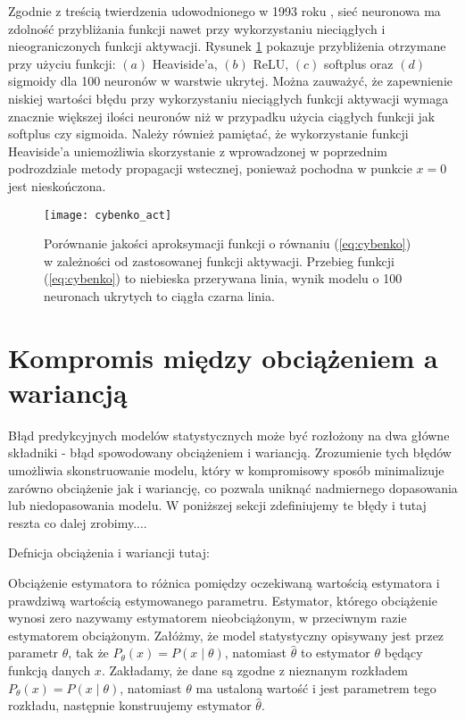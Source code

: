 \documentclass[11pt]{book}
\theoremstyle{definition}
\begin{document}
Zgodnie z treścią twierdzenia udowodnionego w 1993 roku \cite{Leshno1993MultilayerFN}, sieć neuronowa ma zdolność przybliżania funkcji nawet przy wykorzystaniu nieciągłych i nieograniczonych funkcji aktywacji. Rysunek \ref{fig:cybenko3} pokazuje przybliżenia otrzymane przy użyciu funkcji: $(a)$ Heaviside'a, $(b)$ ReLU, $(c)$ softplus oraz $(d)$ sigmoidy dla 100 neuronów w warstwie ukrytej. Można zauważyć, że zapewnienie niskiej wartości błędu przy wykorzystaniu nieciągłych funkcji aktywacji wymaga znacznie większej ilości neuronów niż w przypadku użycia ciągłych funkcji jak softplus czy sigmoida. Należy również pamiętać, że wykorzystanie funkcji Heaviside'a uniemożliwia skorzystanie z wprowadzonej w poprzednim podrozdziale metody propagacji wstecznej, ponieważ pochodna w punkcie $x=0$ jest nieskończona.
	
\begin{figure}[h!]
	\centering
	\texttt{[image: cybenko\_act]}
	\caption{Porównanie jakości aproksymacji funkcji o równaniu (\ref{eq:cybenko}) w zależności od zastosowanej funkcji aktywacji. Przebieg funkcji (\ref{eq:cybenko}) to niebieska przerywana linia, wynik modelu o 100 neuronach ukrytych to ciągła czarna linia.}
		 \label{fig:cybenko3}
\end{figure}

\section[\color{red} Kompromis między obciążeniem a wariancją]{Kompromis między obciążeniem a wariancją}


Błąd predykcyjnych modelów statystycznych może być rozłożony na dwa główne składniki - błąd spowodowany obciążeniem i wariancją. Zrozumienie tych błędów umożliwia skonstruowanie modelu, który w kompromisowy sposób minimalizuje zarówno obciążenie jak i wariancję, co pozwala uniknąć nadmiernego dopasowania lub niedopasowania modelu. W poniższej sekcji zdefiniujemy te błędy i tutaj reszta co dalej zrobimy....

Defnicja obciążenia i wariancji tutaj:


Obciążenie estymatora to różnica pomiędzy oczekiwaną wartością estymatora i prawdziwą wartością estymowanego parametru. Estymator, którego obciążenie wynosi zero nazywamy estymatorem nieobciążonym, w przeciwnym razie estymatorem obciążonym. Załóżmy, że model statystyczny opisywany jest przez parametr $\theta$, tak że $P_{\theta }(x)=P(x\mid \theta)$, natomiast $\hat{\theta}$ to estymator $\theta$ będący funkcją danych $x$. Zakładamy, że dane są zgodne z nieznanym rozkładem $P_{\theta }(x)=P(x\mid \theta)$, natomiast $\theta$ ma ustaloną wartość i jest parametrem tego rozkładu, następnie konstruujemy estymator $\hat{\theta}$.
\end{document}
